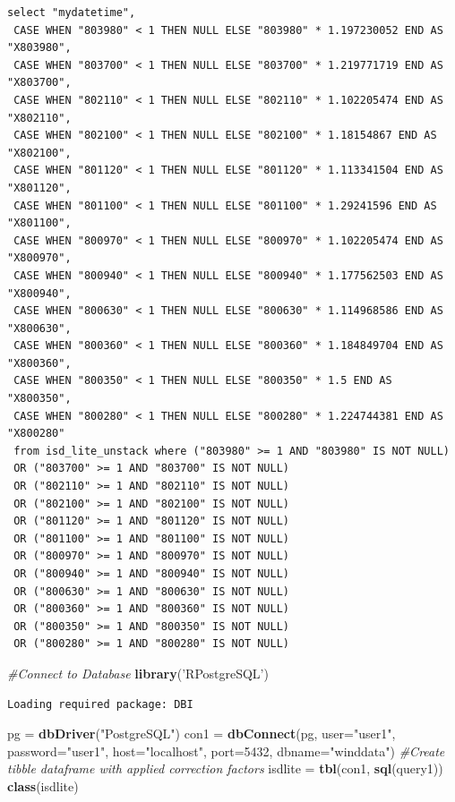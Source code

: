 \documentclass[12pt,oneside]{reedthesis}
\newenvironment{Shaded}{\begin{snugshade}}{\end{snugshade}}
\newcommand{\CommentTok}[1]{\textcolor[rgb]{0.56,0.35,0.01}{\textit{#1}}}
\newcommand{\DataTypeTok}[1]{\textcolor[rgb]{0.13,0.29,0.53}{#1}}
\newcommand{\DecValTok}[1]{\textcolor[rgb]{0.00,0.00,0.81}{#1}}
\newcommand{\KeywordTok}[1]{\textcolor[rgb]{0.13,0.29,0.53}{\textbf{#1}}}
\newcommand{\NormalTok}[1]{#1}
\newcommand{\StringTok}[1]{\textcolor[rgb]{0.31,0.60,0.02}{#1}}
\begin{document}
\begin{verbatim}
select "mydatetime", 
 CASE WHEN "803980" < 1 THEN NULL ELSE "803980" * 1.197230052 END AS "X803980", 
 CASE WHEN "803700" < 1 THEN NULL ELSE "803700" * 1.219771719 END AS "X803700", 
 CASE WHEN "802110" < 1 THEN NULL ELSE "802110" * 1.102205474 END AS "X802110", 
 CASE WHEN "802100" < 1 THEN NULL ELSE "802100" * 1.18154867 END AS "X802100", 
 CASE WHEN "801120" < 1 THEN NULL ELSE "801120" * 1.113341504 END AS "X801120", 
 CASE WHEN "801100" < 1 THEN NULL ELSE "801100" * 1.29241596 END AS "X801100", 
 CASE WHEN "800970" < 1 THEN NULL ELSE "800970" * 1.102205474 END AS "X800970", 
 CASE WHEN "800940" < 1 THEN NULL ELSE "800940" * 1.177562503 END AS "X800940", 
 CASE WHEN "800630" < 1 THEN NULL ELSE "800630" * 1.114968586 END AS "X800630", 
 CASE WHEN "800360" < 1 THEN NULL ELSE "800360" * 1.184849704 END AS "X800360", 
 CASE WHEN "800350" < 1 THEN NULL ELSE "800350" * 1.5 END AS "X800350", 
 CASE WHEN "800280" < 1 THEN NULL ELSE "800280" * 1.224744381 END AS "X800280" 
 from isd_lite_unstack where ("803980" >= 1 AND "803980" IS NOT NULL) 
 OR ("803700" >= 1 AND "803700" IS NOT NULL) 
 OR ("802110" >= 1 AND "802110" IS NOT NULL) 
 OR ("802100" >= 1 AND "802100" IS NOT NULL) 
 OR ("801120" >= 1 AND "801120" IS NOT NULL) 
 OR ("801100" >= 1 AND "801100" IS NOT NULL) 
 OR ("800970" >= 1 AND "800970" IS NOT NULL) 
 OR ("800940" >= 1 AND "800940" IS NOT NULL) 
 OR ("800630" >= 1 AND "800630" IS NOT NULL) 
 OR ("800360" >= 1 AND "800360" IS NOT NULL) 
 OR ("800350" >= 1 AND "800350" IS NOT NULL) 
 OR ("800280" >= 1 AND "800280" IS NOT NULL)
\end{verbatim}
\vspace{0.4cm}
\begin{Shaded}
\begin{Highlighting}[]
    \CommentTok{#Connect to Database}
      \KeywordTok{library}\NormalTok{(}\StringTok{'RPostgreSQL'}\NormalTok{)}
\end{Highlighting}
\end{Shaded}
\begin{verbatim}
Loading required package: DBI
\end{verbatim}
\vspace{0.4cm}
\begin{Shaded}
\begin{Highlighting}[]
\NormalTok{      pg =}\StringTok{ }\KeywordTok{dbDriver}\NormalTok{(}\StringTok{"PostgreSQL"}\NormalTok{)}
\NormalTok{      con1 =}\StringTok{ }\KeywordTok{dbConnect}\NormalTok{(pg, }\DataTypeTok{user=}\StringTok{"user1"}\NormalTok{, }\DataTypeTok{password=}\StringTok{"user1"}\NormalTok{, }\DataTypeTok{host=}\StringTok{"localhost"}\NormalTok{, }\DataTypeTok{port=}\DecValTok{5432}\NormalTok{, }\DataTypeTok{dbname=}\StringTok{"winddata"}\NormalTok{)}
    \CommentTok{#Create tibble dataframe with applied correction factors}
\NormalTok{      isdlite =}\StringTok{ }\KeywordTok{tbl}\NormalTok{(con1, }\KeywordTok{sql}\NormalTok{(query1))}
      \KeywordTok{class}\NormalTok{(isdlite)}
\end{Highlighting}
\end{Shaded}
\end{document}
